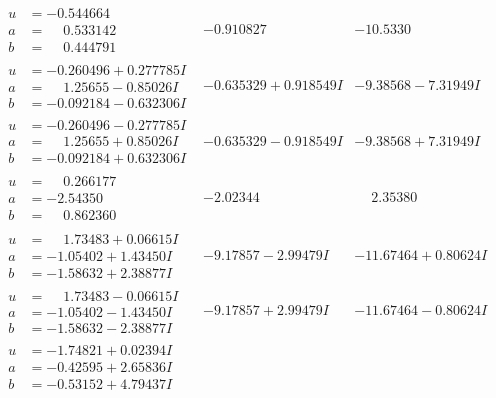 \documentclass[1p]{elsarticle_modified}
\theoremstyle{definition}
\begin{document}
$$\begin{array}{c|c|c}
\begin{aligned}
u &= -0.544664\phantom{ +0.000000I} \\
a &= \phantom{-}0.533142\phantom{ +0.000000I} \\
b &= \phantom{-}0.444791\phantom{ +0.000000I}\end{aligned}
 & -0.910827\phantom{ +0.000000I} & -10.5330\phantom{ +0.000000I} \\ \hline\begin{aligned}
u &= -0.260496 + 0.277785 I \\
a &= \phantom{-}1.25655 - 0.85026 I \\
b &= -0.092184 - 0.632306 I\end{aligned}
 & -0.635329 + 0.918549 I & -9.38568 - 7.31949 I \\ \hline\begin{aligned}
u &= -0.260496 - 0.277785 I \\
a &= \phantom{-}1.25655 + 0.85026 I \\
b &= -0.092184 + 0.632306 I\end{aligned}
 & -0.635329 - 0.918549 I & -9.38568 + 7.31949 I \\ \hline\begin{aligned}
u &= \phantom{-}0.266177\phantom{ +0.000000I} \\
a &= -2.54350\phantom{ +0.000000I} \\
b &= \phantom{-}0.862360\phantom{ +0.000000I}\end{aligned}
 & -2.02344\phantom{ +0.000000I} & \phantom{-}2.35380\phantom{ +0.000000I} \\ \hline\begin{aligned}
u &= \phantom{-}1.73483 + 0.06615 I \\
a &= -1.05402 + 1.43450 I \\
b &= -1.58632 + 2.38877 I\end{aligned}
 & -9.17857 - 2.99479 I & -11.67464 + 0.80624 I \\ \hline\begin{aligned}
u &= \phantom{-}1.73483 - 0.06615 I \\
a &= -1.05402 - 1.43450 I \\
b &= -1.58632 - 2.38877 I\end{aligned}
 & -9.17857 + 2.99479 I & -11.67464 - 0.80624 I \\ \hline\begin{aligned}
u &= -1.74821 + 0.02394 I \\
a &= -0.42595 + 2.65836 I \\
b &= -0.53152 + 4.79437 I\end{aligned}

\end{array}$$
\end{document}
